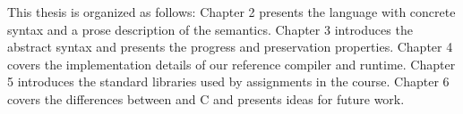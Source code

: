 \vspace{3em}

This thesis is organized as follows: Chapter 2 presents the language with
concrete syntax and a prose description of the semantics. Chapter 3 introduces
the abstract syntax and presents the progress and preservation properties.
Chapter 4 covers the implementation details of our reference compiler and
runtime. Chapter 5 introduces the standard libraries used by assignments in the
course.  Chapter 6 covers the differences between \langname{} and C and presents
ideas for future work.
